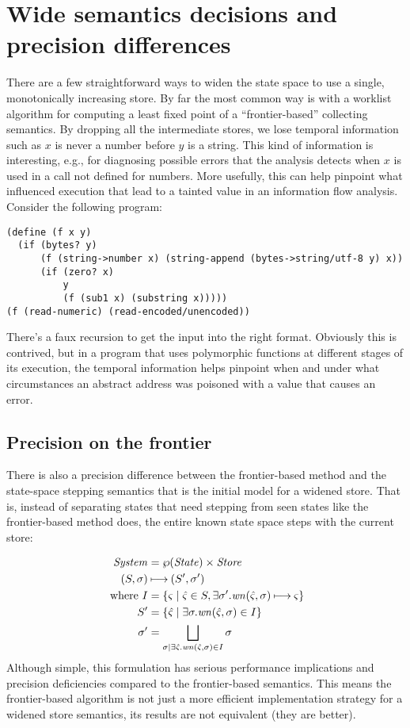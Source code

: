 \documentclass{llncs}
\begin{document}
\section{Wide semantics decisions and precision differences}

There are a few straightforward ways to widen the state space to use a
single, monotonically increasing store. By far the most common way is
with a worklist algorithm for computing a least fixed point of a
``frontier-based'' collecting semantics. By dropping all the
intermediate stores, we lose temporal information such as $x$ is never
a number before $y$ is a string. This kind of information is
interesting, e.g., for diagnosing possible errors that the analysis
detects when $x$ is used in a call not defined for numbers. More
usefully, this can help pinpoint what influenced execution that lead
to a tainted value in an information flow analysis. Consider the
following program:

\begin{lstlisting}
(define (f x y)
  (if (bytes? y)
      (f (string->number x) (string-append (bytes->string/utf-8 y) x))
      (if (zero? x)
          y
          (f (sub1 x) (substring x)))))
(f (read-numeric) (read-encoded/unencoded))
\end{lstlisting}

There's a faux recursion to get the input into the right
format. Obviously this is contrived, but in a program that uses
polymorphic functions at different stages of its execution, the
temporal information helps pinpoint when and under what circumstances
an abstract address was poisoned with a value that causes an error.

\subsection{Precision on the frontier}
There is also a precision difference between the frontier-based method
and the state-space stepping semantics that is the initial model for a
widened store. That is, instead of separating states that need
stepping from seen states like the frontier-based method does, the
entire known state space steps with the current store:

\begin{align*}
\mathit{System} &= \wp(\mathit{State}) \times \mathit{Store} \\
(S,\sigma) &\mathbin{\longmapsto} (S',\sigma') \\
 \text{ where } I &= \{\varsigma \mid \hat{\varsigma} \in S, \exists \sigma'. \mathit{wn}(\hat{\varsigma},\sigma) \mathbin{\longmapsto} \varsigma\} \\
                S' &= \{\hat{\varsigma} \mid \exists \sigma.\mathit{wn}(\hat{\varsigma},\sigma) \in I\} \\
                \sigma' &= \bigsqcup\limits_{\sigma \mid \exists\hat{\varsigma}.\mathit{wn}(\hat{\varsigma},\sigma) \in I}{\sigma}
\end{align*}
Although simple, this formulation has serious performance implications
and precision deficiencies compared to the frontier-based
semantics. This means the frontier-based algorithm is not just a more
efficient implementation strategy for a widened store semantics, its
results are not equivalent (they are better).
\end{document}
